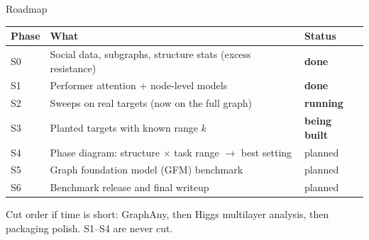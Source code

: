 \documentclass[aspectratio=169,10pt]{beamer}
\newcommand{\snote}[1]{{\scriptsize\textcolor{ink!70}{#1}}}
\newcommand{\sdone}{\textcolor{good}{\textbf{done}}}
\newcommand{\srun}{\textcolor{warm}{\textbf{running}}}
\newcommand{\sbuild}{\textcolor{warm}{\textbf{being built}}}
\newcommand{\splan}{\textcolor{ink!60}{planned}}
\begin{document}
\begin{frame}{Roadmap}
  \centering\small
  \begin{tabular}{@{}lL{0.6\textwidth}l@{}}
    \toprule
    Phase & What & Status \\
    \midrule
    S0 & Social data, subgraphs, structure stats (excess resistance) & \sdone \\
    S1 & Performer attention + node-level models & \sdone \\
    S2 & Sweeps on real targets (now on the full graph) & \srun \\
    S3 & Planted targets with known range $k$ & \sbuild \\
    S4 & Phase diagram: structure $\times$ task range $\to$ best setting & \splan \\
    S5 & Graph foundation model (GFM) benchmark & \splan \\
    S6 & Benchmark release and final writeup & \splan \\
    \bottomrule
  \end{tabular}
  \vspace{0.6em}

  \raggedright\snote{Cut order if time is short: GraphAny, then Higgs multilayer analysis, then packaging polish. S1--S4 are never cut.}
\end{frame}
\end{document}
